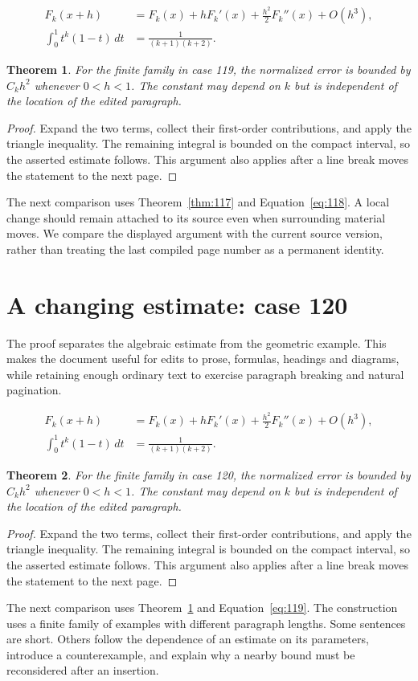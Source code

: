 \documentclass[a4paper,10pt]{article}
\newtheorem{theorem}{Theorem}[section]
\begin{document}
\lipsum[25-26]
\begin{align}\label{eq:118}
 F_k(x+h)&=F_k(x)+hF_k'(x)+\frac{h^2}{2}F_k''(x)+O(h^3),\\
 \int_0^1 t^k(1-t)\,dt&=\frac{1}{(k+1)(k+2)}.
\end{align}
\begin{theorem}\label{thm:118}
For the finite family in case 119, the normalized error is bounded by $C_k h^2$ whenever $0<h<1$. The constant may depend on $k$ but is independent of the location of the edited paragraph.
\end{theorem}
\begin{proof}
Expand the two terms, collect their first-order contributions, and apply the
triangle inequality. The remaining integral is bounded on the compact interval,
so the asserted estimate follows. This argument also applies after a line break
moves the statement to the next page.
\end{proof}
The next comparison uses Theorem~\ref{thm:117} and Equation~\ref{eq:118}. A local change should remain attached to its source even when surrounding material moves. We compare the displayed argument with the current source version, rather than treating the last compiled page number as a permanent identity.

\lipsum[18]

\section{A changing estimate: case 120}\label{unit:119}
The proof separates the algebraic estimate from the geometric example. This makes the document useful for edits to prose, formulas, headings and diagrams, while retaining enough ordinary text to exercise paragraph breaking and natural pagination.

\lipsum[28-29]
\begin{align}\label{eq:119}
 F_k(x+h)&=F_k(x)+hF_k'(x)+\frac{h^2}{2}F_k''(x)+O(h^3),\\
 \int_0^1 t^k(1-t)\,dt&=\frac{1}{(k+1)(k+2)}.
\end{align}
\begin{theorem}\label{thm:119}
For the finite family in case 120, the normalized error is bounded by $C_k h^2$ whenever $0<h<1$. The constant may depend on $k$ but is independent of the location of the edited paragraph.
\end{theorem}
\begin{proof}
Expand the two terms, collect their first-order contributions, and apply the
triangle inequality. The remaining integral is bounded on the compact interval,
so the asserted estimate follows. This argument also applies after a line break
moves the statement to the next page.
\end{proof}
The next comparison uses Theorem~\ref{thm:118} and Equation~\ref{eq:119}. The construction uses a finite family of examples with different paragraph lengths. Some sentences are short. Others follow the dependence of an estimate on its parameters, introduce a counterexample, and explain why a nearby bound must be reconsidered after an insertion.
\end{document}
